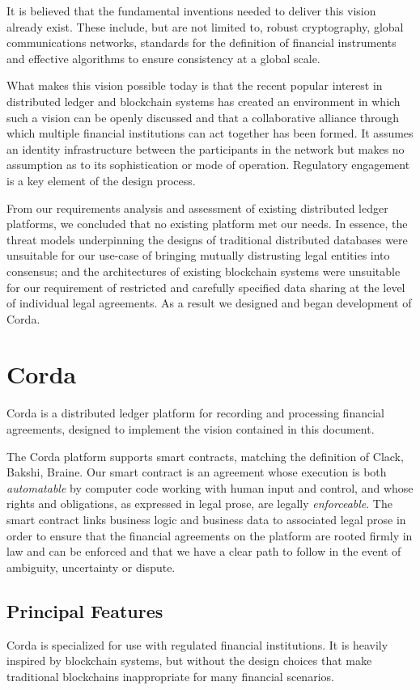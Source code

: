 \documentclass{article}
\begin{document}
It is believed that the fundamental inventions needed to deliver this vision already exist. These include, but are not limited to, robust cryptography, global communications networks, standards for the definition of financial instruments and effective algorithms to ensure consistency at a global scale. 

What makes this vision possible today is that the recent popular interest in distributed ledger and blockchain systems has created an environment in which such a vision can be openly discussed and that a collaborative alliance through which multiple financial institutions can act together has been formed. It assumes an identity infrastructure between the participants in the network but makes no assumption as to its sophistication or mode of operation. Regulatory engagement is a key element of the design process.

From our requirements analysis and assessment of existing distributed ledger platforms, we concluded that no existing platform met our needs.  In essence, the threat models underpinning the designs of traditional distributed databases were unsuitable for our use-case of bringing mutually distrusting legal entities into consensus; and the architectures of existing blockchain systems were unsuitable for our requirement of restricted and carefully specified data sharing at the level of individual legal agreements.  As a result we designed and began development of Corda.

\section{Corda}
Corda is a distributed ledger platform for recording and processing financial agreements, designed to implement the vision contained in this document.  

The Corda platform supports smart contracts, matching the definition of Clack, Bakshi, Braine.\cite{SCT}  Our smart contract is an agreement whose execution is both \textit{automatable} by computer code working with human input and control, and whose rights and obligations, as expressed in legal prose, are legally \textit{enforceable}.  The smart contract links business logic and business data to associated legal prose in order to ensure that the financial agreements on the platform are rooted firmly in law and can be enforced and that we have a clear path to follow in the event of ambiguity, uncertainty or dispute.

\subsection{Principal Features}
Corda is specialized for use with regulated financial institutions. It is heavily inspired by blockchain systems, but without the design choices that make traditional blockchains inappropriate for many financial scenarios. 
\end{document}

